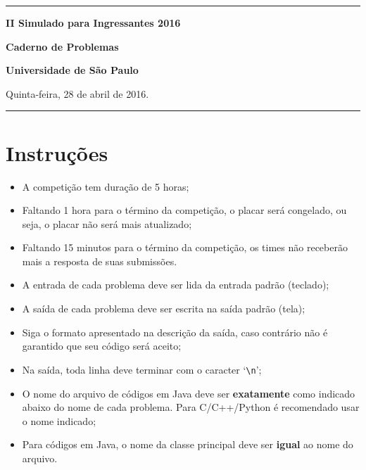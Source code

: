 \documentclass[a4paper,11pt]{article}
\begin{document}

\begin{center}
\noindent

\hrule

\vspace{3.0cm}

\begin{Huge}
  {\bf II Simulado para Ingressantes 2016}
\end{Huge}

\vspace{6.0cm}

\begin{Huge}
{\bf Caderno de Problemas}
\end{Huge}

\vspace{6.0cm}

\begin{Large}
	{\bf Universidade de São Paulo}
\end{Large}

\vspace{0.5cm}

\vfill


Quinta-feira, 28 de abril de 2016.

\vfill
\hrule
\end{center}

\thispagestyle{empty}

\newpage

\section*{Instruções}

\begin{itemize}
	\item A competição tem duração de 5 horas;
	\item Faltando 1 hora para o término da competição, o placar será congelado, ou seja, o placar 
	não será mais atualizado;
	\item Faltando 15 minutos para o término da competição, os times não receberão mais a resposta
	de suas submissões.
	\item A entrada de cada problema deve ser lida da entrada padrão (teclado);
	\item A saída de cada problema deve ser escrita na saída padrão (tela);
	\item Siga o formato apresentado na descrição da saída, caso contrário não é garantido que seu
	código será aceito;
	\item Na saída, toda linha deve terminar com o caracter `\texttt{\textbackslash n}';
	\item O nome do arquivo de códigos em Java deve ser \textbf{exatamente} como indicado abaixo
	do nome de cada problema. Para C/C++/Python é recomendado usar o nome indicado;
	\item Para códigos em Java, o nome da classe principal deve ser \textbf{igual} ao nome do
	arquivo.
\end{itemize}
\end{document}
